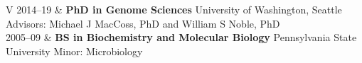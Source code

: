 \documentclass[11pt]{article}
\begin{document}
\cvheader



\begin{longtable}{V}
  2014--19 & {\bf PhD in Genome Sciences}
             \newline University of Washington, Seattle
             \newline Advisors: Michael J MacCoss, PhD and William S Noble, PhD\\
  2005--09 & {\bf BS in Biochemistry and Molecular Biology}
             \newline Pennsylvania State University
             \newline Minor: Microbiology\\
\end{longtable}

\end{document}
